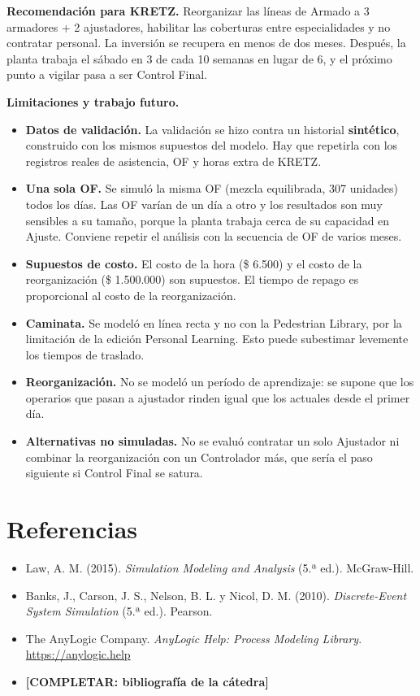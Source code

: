 \documentclass[11pt,a4paper]{article}
\newcommand{\pendiente}[1]{\textbf{[#1]}}
\begin{document}
\textbf{Recomendación para KRETZ.} Reorganizar las líneas de Armado a 3 armadores + 2 ajustadores, habilitar las coberturas entre especialidades y no contratar personal. La inversión se recupera en menos de dos meses. Después, la planta trabaja el sábado en 3 de cada 10 semanas en lugar de 6, y el próximo punto a vigilar pasa a ser Control Final.

\textbf{Limitaciones y trabajo futuro.}

\begin{itemize}
\item \textbf{Datos de validación.} La validación se hizo contra un historial \textbf{sintético}, construido con los mismos supuestos del modelo. Hay que repetirla con los registros reales de asistencia, OF y horas extra de KRETZ.
\item \textbf{Una sola OF.} Se simuló la misma OF (mezcla equilibrada, 307 unidades) todos los días. Las OF varían de un día a otro y los resultados son muy sensibles a su tamaño, porque la planta trabaja cerca de su capacidad en Ajuste. Conviene repetir el análisis con la secuencia de OF de varios meses.
\item \textbf{Supuestos de costo.} El costo de la hora (\$ 6.500) y el costo de la reorganización (\$ 1.500.000) son supuestos. El tiempo de repago es proporcional al costo de la reorganización.
\item \textbf{Caminata.} Se modeló en línea recta y no con la Pedestrian Library, por la limitación de la edición Personal Learning. Esto puede subestimar levemente los tiempos de traslado.
\item \textbf{Reorganización.} No se modeló un período de aprendizaje: se supone que los operarios que pasan a ajustador rinden igual que los actuales desde el primer día.
\item \textbf{Alternativas no simuladas.} No se evaluó contratar un solo Ajustador ni combinar la reorganización con un Controlador más, que sería el paso siguiente si Control Final se satura.
\end{itemize}

\section*{Referencias}


\begin{itemize}
\item Law, A. M. (2015). \emph{Simulation Modeling and Analysis} (5.ª ed.). McGraw-Hill.
\item Banks, J., Carson, J. S., Nelson, B. L. y Nicol, D. M. (2010). \emph{Discrete-Event System Simulation} (5.ª ed.). Pearson.
\item The AnyLogic Company. \emph{AnyLogic Help: Process Modeling Library}. \url{https://anylogic.help}
\item \pendiente{COMPLETAR: bibliografía de la cátedra}
\end{itemize}
\end{document}

